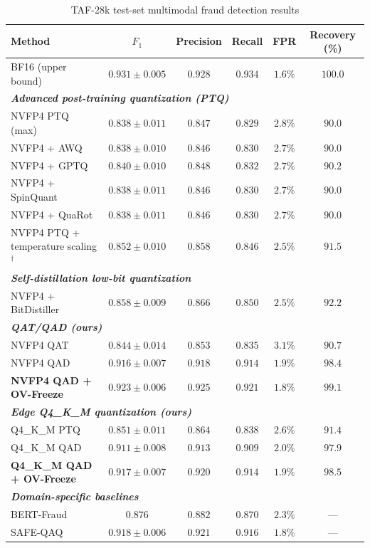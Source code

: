 \documentclass[11pt, a4paper]{article}
\begin{document}
\begin{table}[h]
\centering
\caption{TAF-28k test-set multimodal fraud detection results}
\label{tab3-en}
\small
\renewcommand{\arraystretch}{1.2}
\begin{tabularx}{\textwidth}{Xccccc}
\toprule
\textbf{Method} & \textbf{$F_1$} & \textbf{Precision} & \textbf{Recall} & \textbf{FPR} & \textbf{Recovery (\%)} \\
\midrule
BF16 (upper bound) & $0.931 \pm 0.005$ & $0.928$ & $0.934$ & $1.6\%$ & $100.0$ \\
\midrule
\multicolumn{6}{l}{\emph{\textbf{Advanced post-training quantization (PTQ)}}} \\
NVFP4 PTQ (max) & $0.838 \pm 0.011$ & $0.847$ & $0.829$ & $2.8\%$ & $90.0$ \\
NVFP4 + AWQ & $0.838 \pm 0.010$ & $0.846$ & $0.830$ & $2.7\%$ & $90.0$ \\
NVFP4 + GPTQ & $0.840 \pm 0.010$ & $0.848$ & $0.832$ & $2.7\%$ & $90.2$ \\
NVFP4 + SpinQuant & $0.838 \pm 0.011$ & $0.846$ & $0.830$ & $2.7\%$ & $90.0$ \\
NVFP4 + QuaRot & $0.838 \pm 0.011$ & $0.846$ & $0.830$ & $2.7\%$ & $90.0$ \\
NVFP4 PTQ + temperature scaling$^\dagger$ & $0.852 \pm 0.010$ & $0.858$ & $0.846$ & $2.5\%$ & $91.5$ \\
\midrule
\multicolumn{6}{l}{\emph{\textbf{Self-distillation low-bit quantization}}} \\
NVFP4 + BitDistiller & $0.858 \pm 0.009$ & $0.866$ & $0.850$ & $2.5\%$ & $92.2$ \\
\midrule
\multicolumn{6}{l}{\emph{\textbf{QAT/QAD (ours)}}} \\
NVFP4 QAT & $0.844 \pm 0.014$ & $0.853$ & $0.835$ & $3.1\%$ & $90.7$ \\
NVFP4 QAD & $0.916 \pm 0.007$ & $0.918$ & $0.914$ & $1.9\%$ & $98.4$ \\
\rowcolor[gray]{0.93} \textbf{NVFP4 QAD + OV-Freeze} & $\mathbf{0.923 \pm 0.006}$ & $\mathbf{0.925}$ & $\mathbf{0.921}$ & $\mathbf{1.8\%}$ & $\mathbf{99.1}$ \\
\midrule
\multicolumn{6}{l}{\emph{\textbf{Edge Q4\_K\_M quantization (ours)}}} \\
Q4\_K\_M PTQ & $0.851 \pm 0.011$ & $0.864$ & $0.838$ & $2.6\%$ & $91.4$ \\
Q4\_K\_M QAD & $0.911 \pm 0.008$ & $0.913$ & $0.909$ & $2.0\%$ & $97.9$ \\
\rowcolor[gray]{0.93} \textbf{Q4\_K\_M QAD + OV-Freeze} & $\mathbf{0.917 \pm 0.007}$ & $\mathbf{0.920}$ & $\mathbf{0.914}$ & $\mathbf{1.9\%}$ & $\mathbf{98.5}$ \\
\midrule
\multicolumn{6}{l}{\emph{\textbf{Domain-specific baselines}}} \\
BERT-Fraud & $0.876$ & $0.882$ & $0.870$ & $2.3\%$ & --- \\
SAFE-QAQ & $0.918 \pm 0.006$ & $0.921$ & $0.916$ & $1.8\%$ & --- \\
\bottomrule
\end{tabularx}


\end{table}
\end{document}
